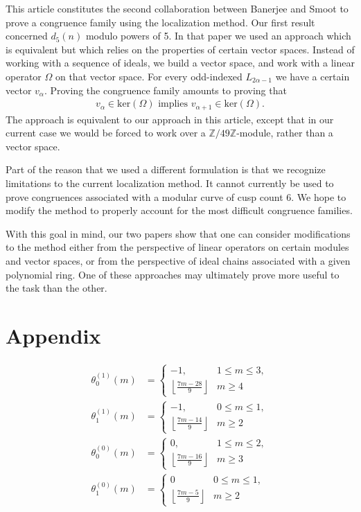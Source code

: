 \documentclass[reqno]{amsart}
\theoremstyle{definition}
\theoremstyle{remark}
\numberwithin{equation}{section}
\begin{document}
This article constitutes the second collaboration between Banerjee and Smoot to prove a congruence family using the localization method.  Our first result \cite{Banerjee} concerned $d_5(n)$ modulo powers of 5.  In that paper we used an approach which is equivalent but which relies on the properties of certain vector spaces.  Instead of working with a sequence of ideals, we build a vector space, and work with a linear operator $\Omega$ on that vector space.  For every odd-indexed $L_{2\alpha-1}$ we have a certain vector $v_{\alpha}$.  Proving the congruence family amounts to proving that 
\begin{align*}
v_{\alpha}\in\mathrm{ker}\left( \Omega \right)\text{ implies } v_{\alpha+1}\in\mathrm{ker}\left( \Omega \right).
\end{align*}  The approach is equivalent to our approach in this article, except that in our current case we would be forced to work over a $\mathbb{Z}/49\mathbb{Z}$-module, rather than a vector space.

Part of the reason that we used a different formulation is that we recognize limitations to the current localization method.  It cannot currently be used to prove congruences associated with a modular curve of cusp count 6.  We hope to modify the method to properly account for the most difficult congruence families.

With this goal in mind, our two papers show that one can consider modifications to the method either from the perspective of linear operators on certain modules and vector spaces, or from the perspective of ideal chains associated with a given polynomial ring.  One of these approaches may ultimately prove more useful to the task than the other.

\pagebreak
\section{Appendix}

\begin{align*}
\theta^{(1)}_{0}(m) &=\begin{cases} -1, & 1\le m\le 3,\\ \left\lfloor \frac{7m-28}{9} \right\rfloor & m\ge 4\end{cases}\\
\theta^{(1)}_{1}(m) &=\begin{cases} -1, & 0\le m\le 1,\\ \left\lfloor \frac{7m-14}{9} \right\rfloor & m\ge 2\end{cases}\\
\theta^{(0)}_{0}(m) &=\begin{cases} 0, & 1\le m\le 2,\\ \left\lfloor \frac{7m-16}{9} \right\rfloor & m\ge 3\end{cases}\\
\theta^{(0)}_{1}(m) &=\begin{cases} 0 & 0\le m\le 1,\\ \left\lfloor \frac{7m-5}{9} \right\rfloor & m\ge 2\end{cases}
\end{align*}
\end{document}
